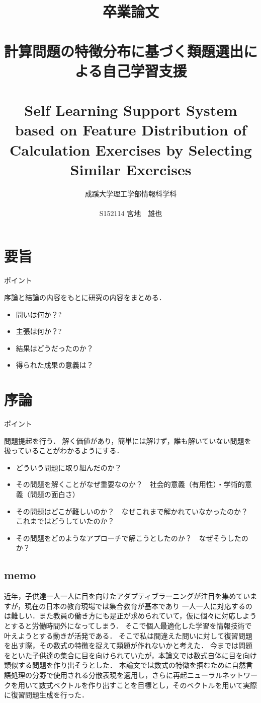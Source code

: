\documentclass[a4j,11pt,report]{jsbook}
\title{卒業論文\\　\vspace{3em}\\{\huge #1}\\　\\#2\vspace{15em}}%
\author{{\huge 成蹊大学理工学部情報科学科}\\　\\{\huge #3}}%
\date{}
\newcommand{\frontpage}[3]{%
\title{卒業論文\\　\vspace{3em}\\{\huge #1}\\　\\#2\vspace{15em}}%
\author{{\huge 成蹊大学理工学部情報科学科}\\　\\{\huge #3}}%
\date{}
\maketitle
\clearpage
\thispagestyle{empty}

\clearpage
}
\newcommand{\point}[1]{
\begin{itembox}[l]{ポイント}
  #1
\end{itembox}
}
\begin{document}
\frontpage  %
{計算問題の特徴分布に基づく類題選出による自己学習支援}
{Self Learning Support System based on Feature Distribution of Calculation Exercises by Selecting Similar Exercises}
{S152114 宮地　雄也}

\chapter*{要旨}
\thispagestyle{empty}
\point{
序論と結論の内容をもとに研究の内容をまとめる．
\begin{itemize}
  \item 問いは何か？?
  \item 主張は何か？?
  \item 結果はどうだったのか？
  \item 得られた成果の意義は？
\end{itemize}
}

\tableofcontents
\thispagestyle{empty}
\clearpage
\thispagestyle{plain}
\setcounter{page}{1}

\chapter{序論 \label{ch:introduction}}

\point{
問題提起を行う．
解く価値があり，簡単には解けず，誰も解いていない問題を扱っていることがわかるようにする．
\begin{itemize}
  \item どういう問題に取り組んだのか？
  \item その問題を解くことがなぜ重要なのか？　社会的意義（有用性）・学術的意義（問題の面白さ）
  \item その問題はどこが難しいのか？　なぜこれまで解かれていなかったのか？　これまではどうしていたのか？
  \item その問題をどのようなアプローチで解こうとしたのか？　なぜそうしたのか？
\end{itemize}
}

\section{memo}
近年，子供達一人一人に目を向けたアダプティブラーニングが注目を集めていますが，現在の日本の教育現場では集合教育が基本であり
一人一人に対応するのは難しい．また教員の働き方にも是正が求められていて，仮に個々に対応しようとすると労働時間外になってしまう．
そこで個人最適化した学習を情報技術で叶えようとする動きが活発である．
そこで私は間違えた問いに対して復習問題を出す際，その数式の特徴を捉えて類題が作れないかと考えた．
今までは問題をといた子供達の集合に目を向けられていたが，本論文では数式自体に目を向け類似する問題を作り出そうとした．
本論文では数式の特徴を掴むために自然言語処理の分野で使用される分散表現を適用し，さらに再起ニューラルネットワークを用いて数式ベクトルを作り出すことを目標とし，そのベクトルを用いて実際に復習問題生成を行った．
\end{document}
